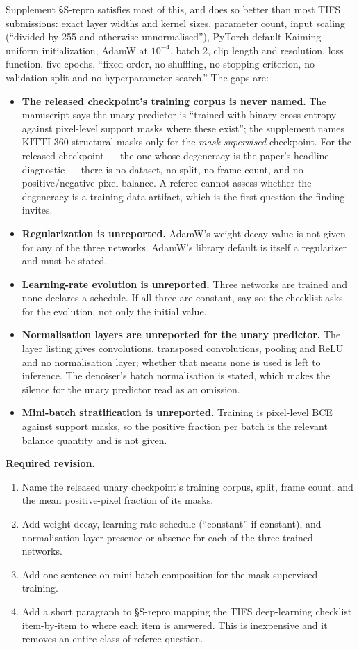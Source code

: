 \documentclass[11pt,a4paper]{article}
\newcommand{\action}{\par\textbf{Required revision.} }
\begin{document}
Supplement \S S-repro satisfies most of this, and does so better than most TIFS
submissions: exact layer widths and kernel sizes, parameter count, input scaling
(``divided by 255 and otherwise unnormalised''), PyTorch-default Kaiming-uniform
initialization, AdamW at $10^{-4}$, batch 2, clip length and resolution, loss
function, five epochs, ``fixed order, no shuffling, no stopping criterion, no
validation split and no hyperparameter search.'' The gaps are:

\begin{itemize}
\item \textbf{The released checkpoint's training corpus is never named.} The
  manuscript says the unary predictor is ``trained with binary cross-entropy
  against pixel-level support masks where these exist''; the supplement names
  KITTI-360 structural masks only for the \emph{mask-supervised} checkpoint.
  For the released checkpoint --- the one whose degeneracy is the paper's
  headline diagnostic --- there is no dataset, no split, no frame count, and no
  positive/negative pixel balance. A referee cannot assess whether the
  degeneracy is a training-data artifact, which is the first question the
  finding invites.
\item \textbf{Regularization is unreported.} AdamW's weight decay value is not
  given for any of the three networks. AdamW's library default is itself a
  regularizer and must be stated.
\item \textbf{Learning-rate evolution is unreported.} Three networks are trained
  and none declares a schedule. If all three are constant, say so; the checklist
  asks for the evolution, not only the initial value.
\item \textbf{Normalisation layers are unreported for the unary predictor.} The
  layer listing gives convolutions, transposed convolutions, pooling and ReLU
  and no normalisation layer; whether that means none is used is left to
  inference. The denoiser's batch normalisation is stated, which makes the
  silence for the unary predictor read as an omission.
\item \textbf{Mini-batch stratification is unreported.} Training is
  pixel-level BCE against support masks, so the positive fraction per batch is
  the relevant balance quantity and is not given.
\end{itemize}

\action
\begin{enumerate}
\item Name the released unary checkpoint's training corpus, split, frame count,
  and the mean positive-pixel fraction of its masks.
\item Add weight decay, learning-rate schedule (``constant'' if constant), and
  normalisation-layer presence or absence for each of the three trained
  networks.
\item Add one sentence on mini-batch composition for the mask-supervised
  training.
\item Add a short paragraph to \S S-repro mapping the TIFS deep-learning
  checklist item-by-item to where each item is answered. This is inexpensive
  and it removes an entire class of referee question.
\end{enumerate}
\end{document}
